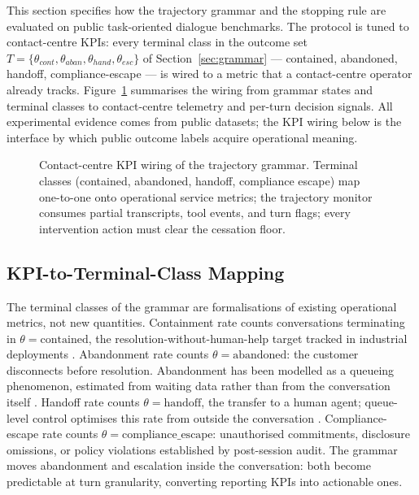 This section specifies how the trajectory grammar and the stopping rule are evaluated on public task-oriented dialogue benchmarks.
The protocol is tuned to contact-centre KPIs: every terminal class in the outcome set $T = \{\theta_{cont}, \theta_{aban}, \theta_{hand}, \theta_{esc}\}$ of Section~\ref{sec:grammar} --- contained, abandoned, handoff, compliance-escape --- is wired to a metric that a contact-centre operator already tracks.
Figure~\ref{fig:eval_stack} summarises the wiring from grammar states and terminal classes to contact-centre telemetry and per-turn decision signals.
All experimental evidence comes from public datasets; the KPI wiring below is the interface by which public outcome labels acquire operational meaning.

\begin{figure}[t]
  \centering
  \resizebox{\linewidth}{!}{%
  }
  \caption{Contact-centre KPI wiring of the trajectory grammar.
           Terminal classes (contained, abandoned, handoff, compliance escape) map one-to-one
           onto operational service metrics; the trajectory monitor consumes partial transcripts,
           tool events, and turn flags; every intervention action must clear the cessation floor.}
  \label{fig:eval_stack}
\end{figure}

\subsection{KPI-to-Terminal-Class Mapping}
\label{subsec:classes}
The terminal classes of the grammar are formalisations of existing operational metrics, not new quantities.
Containment rate counts conversations terminating in $\theta = \text{contained}$, the resolution-without-human-help target tracked in industrial deployments \citep{nubank2026}.
Abandonment rate counts $\theta = \text{abandoned}$: the customer disconnects before resolution.
Abandonment has been modelled as a queueing phenomenon, estimated from waiting data rather than from the conversation itself \citep{silentabandonment2024}.
Handoff rate counts $\theta = \text{handoff}$, the transfer to a human agent; queue-level control optimises this rate from outside the conversation \citep{queuecontrol2026}.
Compliance-escape rate counts $\theta = \text{compliance\_escape}$: unauthorised commitments, disclosure omissions, or policy violations established by post-session audit.
The grammar moves abandonment and escalation inside the conversation: both become predictable at turn granularity, converting reporting KPIs into actionable ones.

